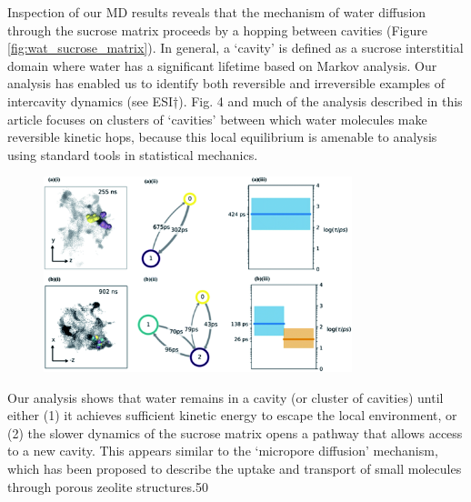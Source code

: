 Inspection of our MD results reveals that the mechanism of water diffusion through the sucrose matrix proceeds by a hopping between cavities (Figure \ref{fig:wat_sucrose_matrix}). In general, a `cavity’ is defined as a sucrose interstitial domain where water has a significant lifetime based on Markov analysis. Our analysis has enabled us to identify both reversible and irreversible examples of intercavity dynamics (see ESI†). Fig. 4 and much of the analysis described in this article focuses on clusters of `cavities’ between which water molecules make reversible kinetic hops, because this local equilibrium is amenable to analysis using standard tools in statistical mechanics.

\begin{figure}
    \centering
    \includegraphics[width=0.8\textwidth]{chapters/water_hopping/figures/f4.png}
    \label{fig:wat_hopping_mech}
\end{figure}

Our analysis shows that water remains in a cavity (or cluster of cavities) until either (1) it achieves sufficient kinetic energy to escape the local environment, or (2) the slower dynamics of the sucrose matrix opens a pathway that allows access to a new cavity. This appears similar to the `micropore diffusion’ mechanism, which has been proposed to describe the uptake and transport of small molecules through porous zeolite structures.50

